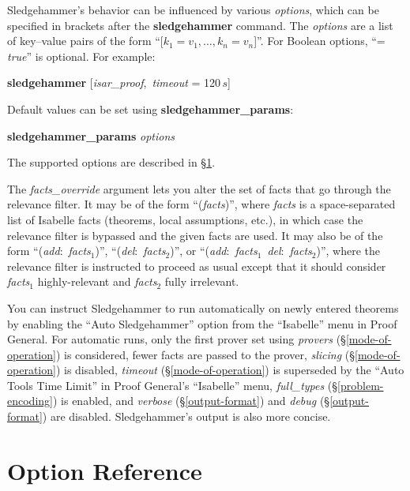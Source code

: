 \documentclass[a4paper,12pt]{article}
\begin{document}
Sledgehammer's behavior can be influenced by various \textit{options}, which can
be specified in brackets after the \textbf{sledgehammer} command. The
\textit{options} are a list of key--value pairs of the form ``[$k_1 = v_1,
\ldots, k_n = v_n$]''. For Boolean options, ``= \textit{true}'' is optional. For
example:

\prew
\textbf{sledgehammer} [\textit{isar\_proof}, \,\textit{timeout} = 120$\,s$]
\postw

Default values can be set using \textbf{sledgehammer\_\allowbreak params}:

\prew
\textbf{sledgehammer\_params} \textit{options}
\postw

The supported options are described in \S\ref{option-reference}.

The \textit{facts\_override} argument lets you alter the set of facts that go
through the relevance filter. It may be of the form ``(\textit{facts})'', where
\textit{facts} is a space-separated list of Isabelle facts (theorems, local
assumptions, etc.), in which case the relevance filter is bypassed and the given
facts are used. It may also be of the form ``(\textit{add}:\ \textit{facts}$_1$)'',
``(\textit{del}:\ \textit{facts}$_2$)'', or ``(\textit{add}:\ \textit{facts}$_1$\
\textit{del}:\ \textit{facts}$_2$)'', where the relevance filter is instructed to
proceed as usual except that it should consider \textit{facts}$_1$
highly-relevant and \textit{facts}$_2$ fully irrelevant.

You can instruct Sledgehammer to run automatically on newly entered theorems by
enabling the ``Auto Sledgehammer'' option from the ``Isabelle'' menu in Proof
General. For automatic runs, only the first prover set using \textit{provers}
(\S\ref{mode-of-operation}) is considered, fewer facts are passed to the prover,
\textit{slicing} (\S\ref{mode-of-operation}) is disabled, \textit{timeout}
(\S\ref{mode-of-operation}) is superseded by the ``Auto Tools Time Limit'' in
Proof General's ``Isabelle'' menu, \textit{full\_types}
(\S\ref{problem-encoding}) is enabled, and \textit{verbose}
(\S\ref{output-format}) and \textit{debug} (\S\ref{output-format}) are disabled.
Sledgehammer's output is also more concise.

\section{Option Reference}
\label{option-reference}
\end{document}
